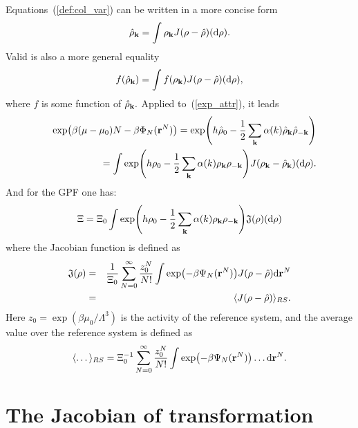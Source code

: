 Equations~(\ref{def:col_var}) can be written in a more concise form
\begin{equation}
	\hat{\rho}_{\vb k} = \int\rho_{\vb k} J(\rho - \hat{\rho}) ({\rm d}\rho).
\end{equation}
Valid is also a more general equality
\begin{equation}
	f(\hat{\rho}_{\vb k}) = \int f(\rho_{\vb k}) J(\rho - \hat{\rho}) ({\rm d}\rho),
\end{equation}
where $f$ is some function of $\hat{\rho}_{\vb k}.$ Applied to~(\ref{exp_attr}), it leads
\begin{eqnarray}
	\label{exp_attr2}
	&&\exp(\beta(\mu - \mu_0)N - \beta\Phi_N(\vb r^N)) = \exp(h\hat{\rho}_0 - \frac{1}{2} \sum_{\vb k} \alpha(k) \hat{\rho}_{\vb k} \hat{\rho}_{-\vb k} )
	\nonumber\\
	&&= \int \exp(h\rho_0 - \frac{1}{2} \sum_{\vb k} \alpha(k) \rho_{\vb k} \rho_{-\vb k}) J(\rho_{\vb k} - \hat{\rho}_{\vb k}) ({\rm d} \rho).
\end{eqnarray}
And for the GPF one has:
\begin{equation}
	\Xi = \Xi_0 \int \exp(h\rho_0 - \frac12\sum_{\vb k}\alpha(k) \rho_{\vb k} \rho_{-\vb k}) \mathfrak{J}(\rho) ({\rm d} \rho)
\end{equation}
where the Jacobian function is defined as
\begin{eqnarray}
	\label{def:jacobian}
	\mathfrak{J}(\rho) &=& \frac{1}{\Xi_0}\sum_{N=0}^{\infty} \frac{z_0^N}{N!}\int \exp(-\beta\Psi_N(\vb r^N)) J(\rho - \hat{\rho}) {\rm d}{\vb r^N}
	\nonumber\\
	&=& \langle J(\rho - \hat{\rho}) \rangle_{RS}.
\end{eqnarray}
Here $z_0=\exp(\beta\mu_0/\Lambda^3)$ is the activity of the reference system, and the average value over the reference system is defined as
\begin{equation}
	\label{def:average_rs}
	\langle \dotsc \rangle_{RS} = \Xi_0^{-1} \sum_{N=0}^{\infty} \frac{z_0^N}{N!} \int \exp(-\beta\Psi_N(\vb r^N)) \dotsc {\rm d} {\vb r}^N.
\end{equation}

\section{\label{sec:jacobian} The Jacobian of transformation}

